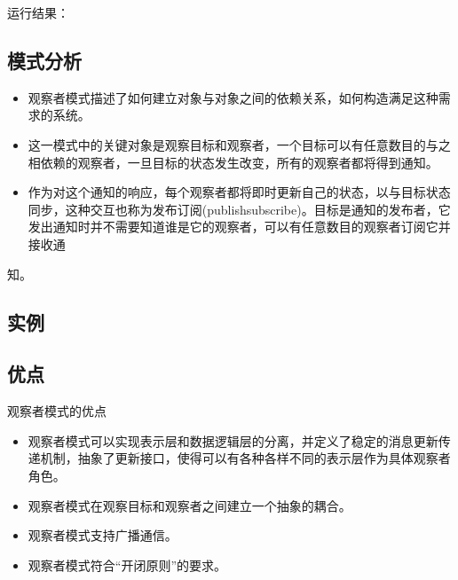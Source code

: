 \documentclass[letterpaper,10pt,english]{sphinxmanual}
\begin{document}
\sphinxAtStartPar
运行结果：

\noindent{}


\subsection{模式分析}
\label{\detokenize{behavioral_patterns/observer:id8}}\begin{itemize}
\item {} 
\sphinxAtStartPar
观察者模式描述了如何建立对象与对象之间的依赖关系，如何构造满足这种需求的系统。

\item {} 
\sphinxAtStartPar
这一模式中的关键对象是观察目标和观察者，一个目标可以有任意数目的与之相依赖的观察者，一旦目标的状态发生改变，所有的观察者都将得到通知。

\item {} 
\sphinxAtStartPar
作为对这个通知的响应，每个观察者都将即时更新自己的状态，以与目标状态同步，这种交互也称为发布\sphinxhyphen{}订阅(publishsubscribe)。目标是通知的发布者，它发出通知时并不需要知道谁是它的观察者，可以有任意数目的观察者订阅它并接收通

\end{itemize}

\sphinxAtStartPar
知。


\subsection{实例}
\label{\detokenize{behavioral_patterns/observer:id9}}

\subsection{优点}
\label{\detokenize{behavioral_patterns/observer:id10}}
\sphinxAtStartPar
观察者模式的优点
\begin{itemize}
\item {} 
\sphinxAtStartPar
观察者模式可以实现表示层和数据逻辑层的分离，并定义了稳定的消息更新传递机制，抽象了更新接口，使得可以有各种各样不同的表示层作为具体观察者角色。

\item {} 
\sphinxAtStartPar
观察者模式在观察目标和观察者之间建立一个抽象的耦合。

\item {} 
\sphinxAtStartPar
观察者模式支持广播通信。

\item {} 
\sphinxAtStartPar
观察者模式符合“开闭原则”的要求。

\end{itemize}
\end{document}
